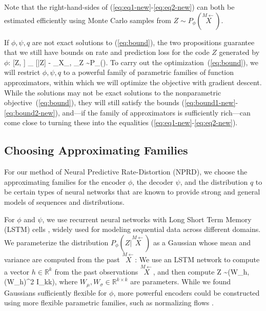 \documentclass[entropy,article,submit,moreauthors,pdftex,10pt,a4paper]{Definitions/mdpi}
\newcommand{\finitefuture}{\stackrel{\rightarrow \scriptscriptstyle{M}}{X}}
\newcommand{\finitepast}{\stackrel{\scriptscriptstyle{M}\leftarrow}{X}}%
\let\oldequation\equation
\let\oldendequation\endequation
\renewenvironment{equation}
  {\linenomathNonumbers\oldequation}
  {\oldendequation\endlinenomath}
\begin{document}
Note that the right-hand-sides of (\ref{eq:eq1-new}-\ref{eq:eq2-new}) can both be estimated efficiently using Monte Carlo samples from $Z \sim P_\phi(\finitepast)$.

If $\phi, \psi, q$ are not exact solutions to (\ref{eq:bound}), the two propositions guarantee that we still have bounds on rate and prediction loss for the code $Z$ generated by $\phi$:
\begin{equation}\label{eq:bound1-new}
 [Z, \finitepast] \leq   {}_{\finitepast}\left[ \operatorname{D_{KL}}\infdivx{P_\phi(Z|\finitepast)}{q(Z)}\right]
\end{equation}
\begin{equation}\label{eq:bound2-new}
  [\finitefuture|Z] \leq   - _{X_{\finitepast, \finitefuture}}	_{Z \sim P_\phi(\finitepast)}\left[\log P_\psi(\finitefuture | Z)\right]. %
\end{equation}
To carry out the optimization~(\ref{eq:bound}), we will restrict $\phi, \psi, q$ to a powerful family of parametric families of function approximators, within which we will optimize the objective with gradient descent.
While the solutions may not be exact solutions to the nonparametric objective~(\ref{eq:bound}), they will still satisfy the bounds (\ref{eq:bound1-new}-\ref{eq:bound2-new}), and---if the family of approximators is sufficiently rich---can come close to turning these into the equalities (\ref{eq:eq1-new}-\ref{eq:eq2-new}).
 



\subsection{Choosing Approximating Families}
For our method of Neural Predictive Rate-Distortion (NPRD), we choose the approximating families for the encoder $\phi$, the decoder $\psi$, and the distribution $q$ to be certain types of neural networks that are known to provide strong and general models of sequences and distributions.

For $\phi$ and $\psi$, we use recurrent neural networks with Long Short Term Memory (LSTM) cells \citep{hochreiter-long-1997}, widely used for modeling sequential data across different domains.
We parameterize the distribution $P_\phi(Z|\finitepast)$ as a Gaussian whose mean and variance are computed from the past $\finitepast$:
We use an LSTM network to compute a vector $h \in \mathbb{R}^k$ from the past observations $\finitepast$, and then compute
\begin{equation}\label{eq:z-gauss}
	Z \sim {}(W_\mu h, (W_\sigma h)^2 I_{k\times k}),
\end{equation}
where $W_\mu, W_\sigma \in \mathbb{R}^{k\times k}$ are parameters.
While we found Gaussians sufficiently flexible for $\phi$, more powerful encoders could be constructed using more flexible parametric families, such as normalizing flows \citep{rezende-variational-2015, kingma-improving-2016}.
\end{document}
